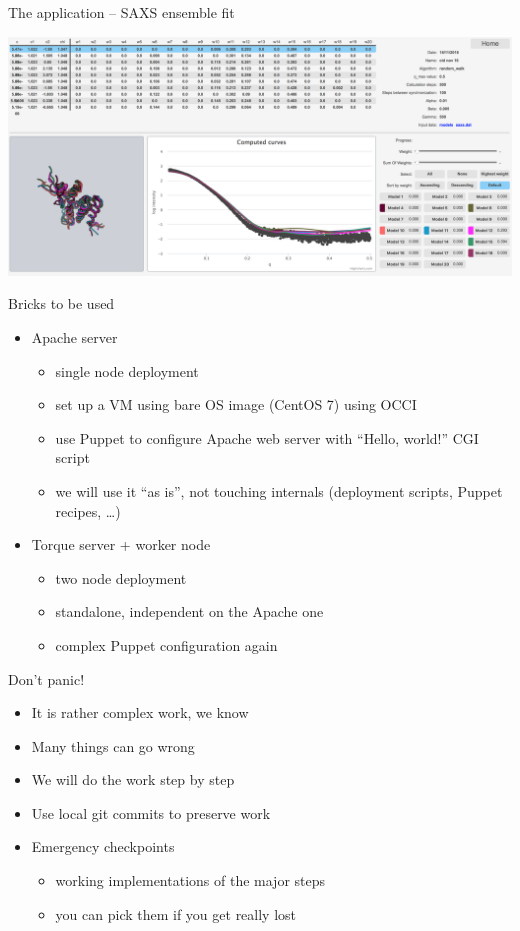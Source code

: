 \documentclass[smaller,t]{beamer}
\begin{document}
\begin{frame}{The application -- SAXS ensemble fit}
\begin{center}
\includegraphics[width=.95\hsize]{saxs_cid}
\end{center}
\end{frame}

\begin{frame}{Bricks to be used}
\begin{itemize}
\item Apache server
\begin{itemize}
\item single node deployment
\item set up a VM using bare OS image (CentOS 7) using OCCI
\item use Puppet to configure Apache web server with ``Hello, world!'' CGI script
\item we will use it ``as is'', not touching internals (deployment scripts, Puppet recipes, \dots)
\end{itemize}

\item Torque server + worker node
\begin{itemize}
\item two node deployment
\item standalone, independent on the Apache one
\item complex Puppet configuration again
\end{itemize}
\end{itemize}
\end{frame}

\begin{frame}{Don't panic!}
\begin{itemize}
\item It is rather complex work, we know
\item Many things can go wrong
\item We will do the work step by step
\item Use local git commits to preserve work
\item Emergency checkpoints
\begin{itemize}
\item working implementations of the major steps
\item you can pick them if you get really lost 
\end{itemize}
\end{itemize}
\end{frame}
\end{document}
